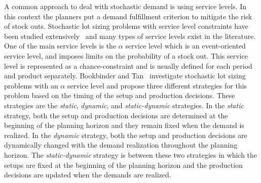 \documentclass[11pt]{article}
\begin{document}
A common approach to deal with stochastic demand is using service levels. In this context the planners put  a demand fulfillment criterion to mitigate the risk of stock outs.  Stochastic lot sizing problems with service level constraints have been studied extensively~\cite{tempelmeier2007stochastic} and many types of service levels exist in the literature. One of the main service levels is the $\alpha$ service level which is an event-oriented service level, and imposes limits on the probability of a stock out. This service level is represented as a chance-constraint and is usually defined for each period and product separately. Bookbinder and Tan~\cite{bookbinder1988strategies} investigate stochastic lot sizing problems with an $\alpha$ service level and propose three different strategies for this problem based on the timing of the setup and production decisions. These strategies are the \textit{static}, \textit{dynamic}, and \textit{static-dynamic} strategies. In the \textit{static} strategy, both the setup and production decisions are determined at the beginning of the planning horizon and they remain fixed when the demand is realized. In the \textit{dynamic} strategy, both the setup and production decisions are dynamically changed with the demand realization throughout the planning horizon. The \textit{static-dynamic} strategy is between these two strategies in which the setups are fixed at the beginning of the planning horizon and the production decisions are updated when the demands are realized. %
\end{document}

